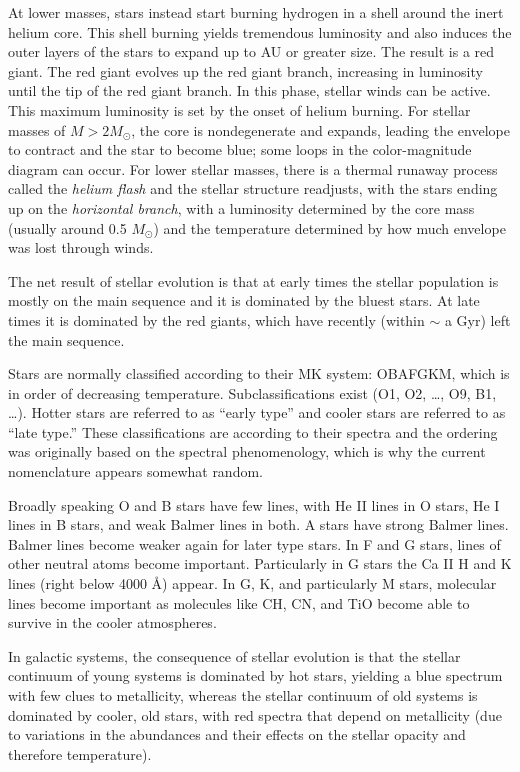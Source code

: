At lower masses, stars instead start burning hydrogen in a shell
around the inert helium core. This shell burning yields tremendous
luminosity and also induces the outer layers of the stars to expand up
to AU or greater size. The result is a red giant. The red giant
evolves up the red giant branch, increasing in luminosity until the
tip of the red giant branch. In this phase, stellar winds can be
active. This maximum luminosity is set by the onset of helium
burning. For stellar masses of $M>2M_\odot$, the core is nondegenerate
and expands, leading the envelope to contract and the star to become
blue; some loops in the color-magnitude diagram can occur. For lower
stellar masses, there is a thermal runaway process called the {\it
helium flash} and the stellar structure readjusts, with the stars
ending up on the {\it horizontal branch}, with a luminosity determined
by the core mass (usually around 0.5 $M_\odot$) and the temperature
determined by how much envelope was lost through winds.

The net result of stellar evolution is that at early times the stellar
population is mostly on the main sequence and it is dominated by the
bluest stars. At late times it is dominated by the red giants, which
have recently (within $\sim$ a Gyr) left the main sequence.

Stars are normally classified according to their MK system: OBAFGKM,
which is in order of decreasing temperature. Subclassifications exist
(O1, O2, \ldots, O9, B1, \ldots). Hotter stars are referred to as
``early type'' and cooler stars are referred to as ``late type.''
These classifications are according to their spectra and the ordering
was originally based on the spectral phenomenology, which is why the
current nomenclature appears somewhat random.

Broadly speaking O and B stars have few lines, with He II lines in O
stars, He I lines in B stars, and weak Balmer lines in both. A stars
have strong Balmer lines. Balmer lines become weaker again for later
type stars. In F and G stars, lines of other neutral atoms become
important. Particularly in G stars the Ca II H and K lines (right
below 4000 \AA) appear. In G, K, and particularly M stars, molecular
lines become important as molecules like CH, CN, and TiO become able
to survive in the cooler atmospheres.

In galactic systems, the consequence of stellar evolution is that the
stellar continuum of young systems is dominated by hot stars, yielding
a blue spectrum with few clues to metallicity, whereas the stellar
continuum of old systems is dominated by cooler, old stars, with red
spectra that depend on metallicity (due to variations in the
abundances and their effects on the stellar opacity and therefore
temperature). 

